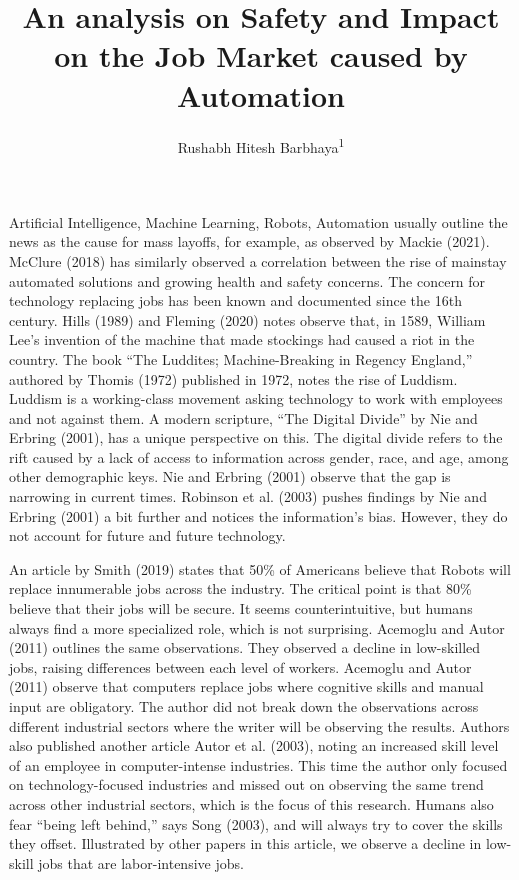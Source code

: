 \documentclass[
  man,floatsintext]{apa7}
\title{An analysis on Safety and Impact on the Job Market caused by Automation}
\author{Rushabh Hitesh Barbhaya\textsuperscript{1}}
\date{}
\affiliation{\vspace{0.5cm}\textsuperscript{1} Harrisburg University of Science and Technology}
\begin{document}
\maketitle

Artificial Intelligence, Machine Learning, Robots, Automation usually outline the news as the cause for mass layoffs, for example, as observed by Mackie (2021). McClure (2018) has similarly observed a correlation between the rise of mainstay automated solutions and growing health and safety concerns. The concern for technology replacing jobs has been known and documented since the 16th century. Hills (1989) and Fleming (2020) notes observe that, in 1589, William Lee's invention of the machine that made stockings had caused a riot in the country. The book ``The Luddites; Machine-Breaking in Regency England,'' authored by Thomis (1972) published in 1972, notes the rise of Luddism. Luddism is a working-class movement asking technology to work with employees and not against them. A modern scripture, ``The Digital Divide'' by Nie and Erbring (2001), has a unique perspective on this. The digital divide refers to the rift caused by a lack of access to information across gender, race, and age, among other demographic keys. Nie and Erbring (2001) observe that the gap is narrowing in current times. Robinson et al. (2003) pushes findings by Nie and Erbring (2001) a bit further and notices the information's bias. However, they do not account for future and future technology.

An article by Smith (2019) states that 50\% of Americans believe that Robots will replace innumerable jobs across the industry. The critical point is that 80\% believe that their jobs will be secure. It seems counterintuitive, but humans always find a more specialized role, which is not surprising. Acemoglu and Autor (2011) outlines the same observations. They observed a decline in low-skilled jobs, raising differences between each level of workers. Acemoglu and Autor (2011) observe that computers replace jobs where cognitive skills and manual input are obligatory. The author did not break down the observations across different industrial sectors where the writer will be observing the results. Authors also published another article Autor et al. (2003), noting an increased skill level of an employee in computer-intense industries. This time the author only focused on technology-focused industries and missed out on observing the same trend across other industrial sectors, which is the focus of this research. Humans also fear ``being left behind,'' says Song (2003), and will always try to cover the skills they offset. Illustrated by other papers in this article, we observe a decline in low-skill jobs that are labor-intensive jobs.
\end{document}
